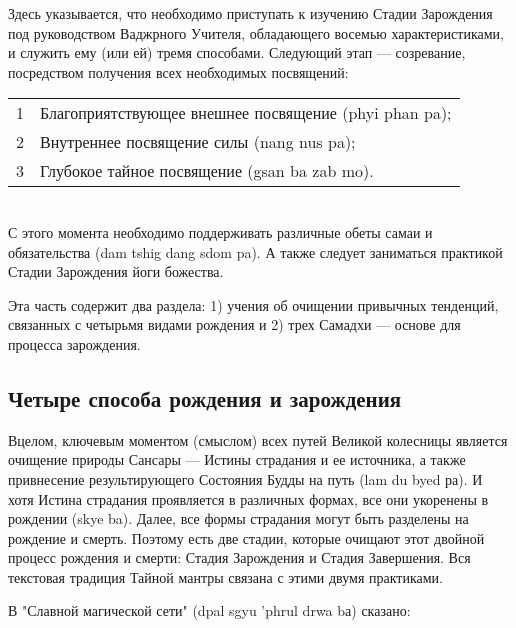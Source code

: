Здесь указывается, что необходимо приступать к изучению Стадии Зарождения под
руководством Ваджрного Учителя, обладающего восемью характеристиками, и служить ему
(или ей) тремя способами. Следующий этап — созревание, посредством получения всех
необходимых посвящений:\\

\begin{tabular}{ll}
1 & Благоприятствующее внешнее посвящение (phyi phan pa);\\
2 & Внутреннее посвящение силы (nang nus pa);\\
3 & Глубокое тайное посвящение (gsan ba zab mo).\\
\end{tabular}
\\
С этого момента необходимо поддерживать различные обеты самаи и обязательства
(dam tshig dang sdom pa). А также следует заниматься практикой Стадии Зарождения йоги
божества.\\

\begin{siderules}
Эта часть содержит два раздела:
1) учения об очищении привычных тенденций, связанных с четырьмя видами рождения и
2) трех Самадхи — основе для процесса зарождения.
\end{siderules}

\subsection{Четыре способа рождения и зарождения}

\begin{siderules}
Вцелом, ключевым моментом (смыслом) всех путей Великой колесницы является очищение
природы Сансары — Истины страдания и ее источника, а также привнесение
результирующего Состояния Будды на путь (lam du byed ра). И хотя Истина страдания
проявляется в различных формах, все они укоренены в рождении (skye ba).
Далее, все формы страдания могут быть разделены на рождение и смерть.
Поэтому есть две стадии, которые очищают этот двойной процесс рождения и смерти:
Стадия Зарождения и Стадия Завершения. Вся текстовая традиция Тайной мантры
связана с этими двумя практиками.
\end{siderules}

В "Славной магической сети" (dpal sgyu 'phrul drwa bа) сказано:

